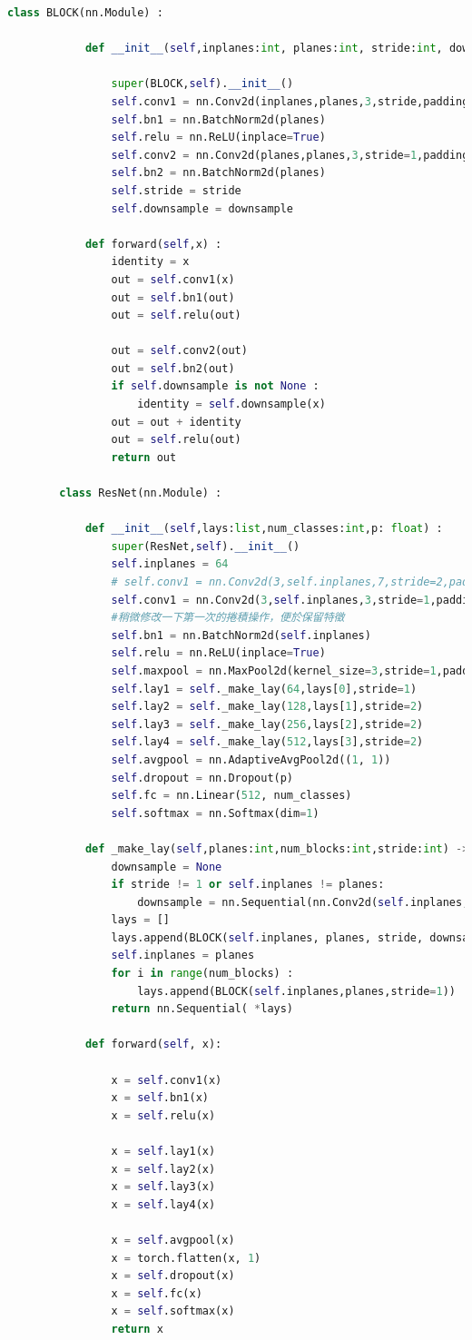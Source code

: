 \documentclass{article}
\begin{document}
	\begin{lstlisting}[language=Python, caption=网络结构代码]
		class BLOCK(nn.Module) :
		
			def __init__(self,inplanes:int, planes:int, stride:int, downsample=None) :
			
				super(BLOCK,self).__init__() 
				self.conv1 = nn.Conv2d(inplanes,planes,3,stride,padding=1,bias=False) 
				self.bn1 = nn.BatchNorm2d(planes) 
				self.relu = nn.ReLU(inplace=True)
				self.conv2 = nn.Conv2d(planes,planes,3,stride=1,padding=1,bias=False)
				self.bn2 = nn.BatchNorm2d(planes)
				self.stride = stride
				self.downsample = downsample
			
			def forward(self,x) :
				identity = x
				out = self.conv1(x)
				out = self.bn1(out)
				out = self.relu(out)
				
				out = self.conv2(out)
				out = self.bn2(out)
				if self.downsample is not None :
					identity = self.downsample(x)
				out = out + identity
				out = self.relu(out)
				return out
		
		class ResNet(nn.Module) :
		
			def __init__(self,lays:list,num_classes:int,p: float) :
				super(ResNet,self).__init__()
				self.inplanes = 64
				# self.conv1 = nn.Conv2d(3,self.inplanes,7,stride=2,padding=3)
				self.conv1 = nn.Conv2d(3,self.inplanes,3,stride=1,padding=1)
				#稍微修改一下第一次的捲積操作，便於保留特徵
				self.bn1 = nn.BatchNorm2d(self.inplanes)
				self.relu = nn.ReLU(inplace=True)
				self.maxpool = nn.MaxPool2d(kernel_size=3,stride=1,padding=1) #後面池化操作進行刪除
				self.lay1 = self._make_lay(64,lays[0],stride=1)
				self.lay2 = self._make_lay(128,lays[1],stride=2)
				self.lay3 = self._make_lay(256,lays[2],stride=2)
				self.lay4 = self._make_lay(512,lays[3],stride=2)
				self.avgpool = nn.AdaptiveAvgPool2d((1, 1))
				self.dropout = nn.Dropout(p)
				self.fc = nn.Linear(512, num_classes)
				self.softmax = nn.Softmax(dim=1)
			
			def _make_lay(self,planes:int,num_blocks:int,stride:int) -> nn.Sequential :
				downsample = None
				if stride != 1 or self.inplanes != planes:
					downsample = nn.Sequential(nn.Conv2d(self.inplanes, planes, 1, stride=stride, bias=False), nn.BatchNorm2d(planes))
				lays = []
				lays.append(BLOCK(self.inplanes, planes, stride, downsample))
				self.inplanes = planes
				for i in range(num_blocks) :
					lays.append(BLOCK(self.inplanes,planes,stride=1))
				return nn.Sequential( *lays)
			
			def forward(self, x):
			
				x = self.conv1(x)
				x = self.bn1(x)
				x = self.relu(x)
				
				x = self.lay1(x)
				x = self.lay2(x)
				x = self.lay3(x)
				x = self.lay4(x)
				
				x = self.avgpool(x)
				x = torch.flatten(x, 1)
				x = self.dropout(x)
				x = self.fc(x)
				x = self.softmax(x)
				return x
		
	\end{lstlisting}
	
\end{document}
